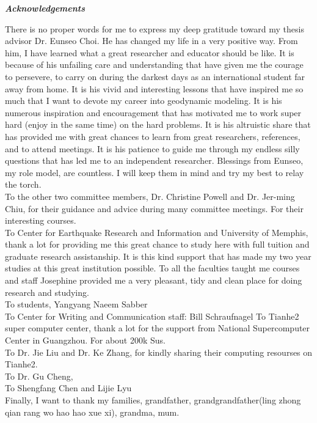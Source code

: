 \begin{center}
\textbf{\textit{Acknowledgements}}
\end{center}

There is no proper words for me to express my deep gratitude toward my thesis advisor Dr. Eunseo Choi. He has changed my life in a very positive way. From him, I have learned what a great researcher and educator should be like. It is because of his unfailing care and understanding that have given me the courage to persevere, to carry on during the darkest days as an international student far away from home. It is his vivid and interesting lessons that have inspired me so much that I want to devote my career into geodynamic modeling. It is his numerous inspiration and encouragement that has motivated me to work super hard (enjoy in the same time) on the hard problems. It is his altruistic share that has provided me with great chances to learn from great researchers, references, and to attend meetings. It is his patience to guide me through my endless silly questions that has led me to an independent researcher. Blessings from Eunseo, my role model, are countless. I will keep them in mind and try my best to relay the torch.
\\
To the other two committee members, Dr. Christine Powell and Dr. Jer-ming Chiu, for their guidance and advice during many committee meetings. For their interesting courses.
\\
To Center for Earthquake Research and Information and University of Memphis, thank a lot for providing me this great chance to study here with full tuition and graduate research assistanship. It is this kind support that has made my two year studies at this great institution possible. To all the faculties taught me courses and staff Josephine provided me a very pleasant, tidy and clean place for doing research and studying. 
\\
To students,
Yangyang
Naeem
Sabber
\\
To Center for Writing and Communication staff: Bill Schraufnagel
To Tianhe2 super computer center, thank a lot for the support from National Supercomputer Center in Guangzhou. For about 200k Sus.
\\
To Dr. Jie Liu and Dr. Ke Zhang, for kindly sharing their computing resourses on Tianhe2.
\\
To Dr. Gu Cheng,
\\
To Shengfang Chen and Lijie Lyu 
\\
Finally, I want to thank my families, grandfather, grandgrandfather(ling zhong qian rang wo hao hao xue xi), grandma, mum.

